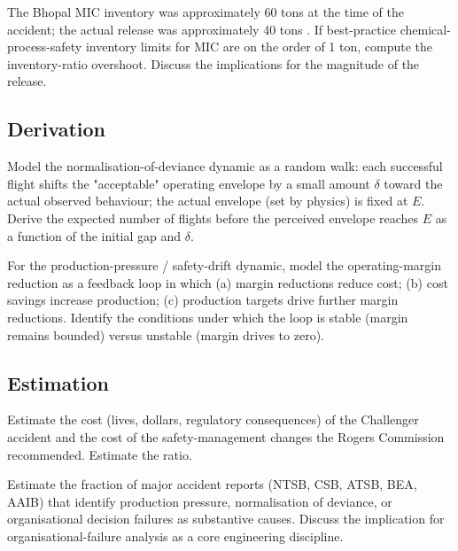 \begin{exercise}
The Bhopal MIC inventory was approximately 60 tons at the time of the accident; the actual release was approximately 40 tons \cite{acc:icmr-bhopal-2004}. If best-practice chemical-process-safety inventory limits for MIC are on the order of 1 ton, compute the inventory-ratio overshoot. Discuss the implications for the magnitude of the release.
\end{exercise}

\subsection*{Derivation}

\begin{exercise}
Model the normalisation-of-deviance dynamic as a random walk: each successful flight shifts the "acceptable" operating envelope by a small amount $\delta$ toward the actual observed behaviour; the actual envelope (set by physics) is fixed at $E$. Derive the expected number of flights before the perceived envelope reaches $E$ as a function of the initial gap and $\delta$.
\end{exercise}

\begin{exercise}
For the production-pressure / safety-drift dynamic, model the operating-margin reduction as a feedback loop in which (a) margin reductions reduce cost; (b) cost savings increase production; (c) production targets drive further margin reductions. Identify the conditions under which the loop is stable (margin remains bounded) versus unstable (margin drives to zero).
\end{exercise}

\subsection*{Estimation}

\begin{exercise}
Estimate the cost (lives, dollars, regulatory consequences) of the Challenger accident \cite{acc:nasa-challenger} and the cost of the safety-management changes the Rogers Commission recommended. Estimate the ratio.
\end{exercise}

\begin{exercise}
Estimate the fraction of major accident reports (NTSB, CSB, ATSB, BEA, AAIB) that identify production pressure, normalisation of deviance, or organisational decision failures as substantive causes. Discuss the implication for organisational-failure analysis as a core engineering discipline.
\end{exercise}

